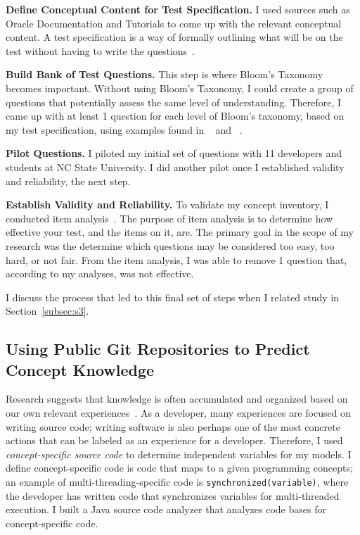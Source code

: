 \documentclass{llncs}
\begin{document}
\vspace{0.5em}
\noindent\textbf{Define Conceptual Content for Test Specification.} I used sources such as Oracle Documentation and Tutorials to come up with the relevant conceptual content. A test specification is a way of formally outlining what will be on the test without having to write the questions~\cite{tew2010developing}. 

\vspace{0.5em}

\noindent\textbf{Build Bank of Test Questions.} This step is where Bloom's Taxonomy becomes important. Without using Bloom's Taxonomy, I could create a group of questions that potentially assess the same level of understanding. Therefore, I came up with at least 1 question for each level of Bloom's taxonomy, based on my test specification, using examples found in ~\cite{nelson1967testing} and ~\cite{thompson2008bloom}.  

\vspace*{0.5em}

\noindent\textbf{Pilot Questions.} I piloted my initial set of questions with 11 developers and students at NC State University. I did another pilot once I established validity and reliability, the next step.

\vspace*{0.5em}

\noindent \textbf{Establish Validity and Reliability.} To validate my concept inventory, I conducted item analysis~\cite{gorsuch1997exploratory}. The purpose of item analysis is to determine how effective your test, and the items on it, are. The primary goal in the scope of my research was the determine which questions may be considered too easy, too hard, or not fair. From the item analysis, I was able to remove 1 question that, according to my analyses, was not effective.


I discuss the process that led to this final set of steps when I related study in Section~\ref{subsec:s3}.

\subsection{Using Public Git Repositories to Predict Concept Knowledge}
Research suggests that knowledge is often accumulated and organized based on our own relevant experiences~\cite{johnson1989mental,argote2011organizational}. As a developer, many experiences are focused on writing source code; writing software is also perhaps one of the most concrete actions that can be labeled as an experience for a developer. Therefore, I used \emph{concept-specific source code} to determine independent variables for my models. I define concept-specific code is code that maps to a given programming concepts; an example of multi-threading-specific code is \texttt{synchronized(variable)}, where the developer has written code that synchronizes variables for multi-threaded execution.
I built a Java source code analyzer that analyzes code bases for concept-specific code.
\end{document}
